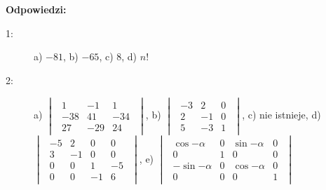 \documentclass{article}
\begin{document}
\newpage
\textbf{Odpowiedzi:}
\begin{description}
    \item [1:] a) $-81$, b) $-65$, c) $8$, d) $n!$
    \item [2:] a) $\begin{vmatrix}\begin{array}{rrr} 1 & -1 & 1\\ -38 & 41 & -34\\ 27 & -29 & 24 \end{array}\end{vmatrix}$, b) $\begin{vmatrix}\begin{array}{rrr} -3 & 2 & 0\\ 2 & -1 & 0\\ 5 & -3 & 1 \end{array}\end{vmatrix}$, c) nie istnieje, d) $\begin{vmatrix}\begin{array}{rrrr} -5 & 2 & 0 & 0\\ 3 & -1 & 0 & 0\\ 0 & 0 & 1 & -5\\ 0 & 0 & -1 & 6 \end{array}\end{vmatrix}$, e) $\begin{vmatrix}\begin{array}{rrrr} \cos{-\alpha} & 0 & \sin{-\alpha} & 0\\ 0 & 1 & 0 & 0\\ -\sin{-\alpha} & 0 & \cos{-\alpha} & 0\\ 0 & 0 & 0 & 1 \end{array} \end{vmatrix}$
\end{description}
\end{document}
